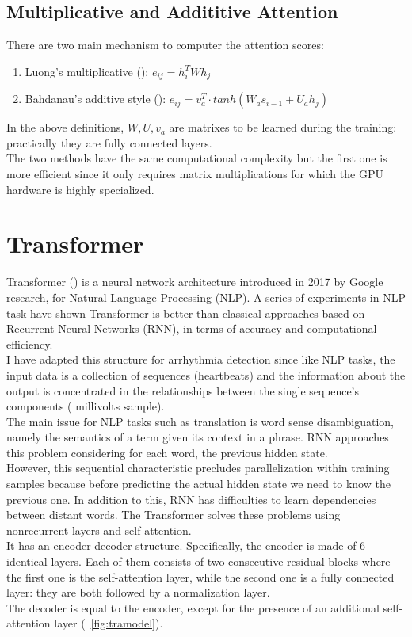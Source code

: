 \documentclass[LaM,binding=0.6cm]{sapthesis}
\begin{document}
\subsection{Multiplicative and Addititive Attention}
There are two main mechanism to computer the attention scores:
\begin{enumerate}
\item Luong's multiplicative (\cite{luong}): $e_{ij} = h_{i}^{T}Wh_{j}$
\item Bahdanau's additive style (\cite{psy}): $e_{ij} = v_{a}^{T} \cdot tanh(W_{a}s_{i-1} + U_{a}h_j)$
\end{enumerate}
In the above definitions, $W,U,v_a$ are matrixes to be learned during the training: practically they are fully connected layers.\\The two methods have the same computational complexity but the first one is more efficient since it only requires matrix multiplications for which the GPU hardware is highly specialized.



\section{Transformer}
Transformer (\cite{aiayn}) is a neural network architecture introduced in 2017 by Google research, for Natural Language Processing (NLP). A series of experiments in NLP task have shown Transformer is better than classical approaches based on Recurrent Neural Networks (RNN), in terms of accuracy and computational efficiency.\\I have adapted this structure for arrhythmia detection since like NLP tasks, the input data is a collection of sequences  (heartbeats) and the information about the output is concentrated in the relationships between the single sequence's components ( millivolts sample).\\The main issue for NLP tasks such as translation is word sense disambiguation, namely the semantics of a term given its context in a phrase. RNN approaches this problem considering for each word, the previous hidden state.\\However, this sequential characteristic precludes parallelization within training samples because before predicting the actual hidden state we need to know the previous one. In addition to this, RNN has difficulties to learn dependencies between distant words. The Transformer solves these problems using nonrecurrent layers and self-attention.\\It has an encoder-decoder structure. Specifically, the encoder is made of 6 identical layers. Each of them consists of two consecutive residual blocks where the first one is the self-attention layer, while the second one is a fully connected layer: they are both followed by a normalization layer.\\The decoder is equal to the encoder, except for the presence of an additional self-attention layer (~\ref{fig:tramodel}).
\end{document}
